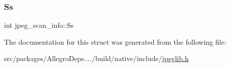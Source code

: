 \subsubsection{\texorpdfstring{Ss}{Ss}}
{\footnotesize\ttfamily int jpeg\+\_\+scan\+\_\+info\+::\+Ss}



The documentation for this struct was generated from the following file\+:\begin{DoxyCompactItemize}
\item 
src/packages/\+Allegro\+Deps..../build/native/include/\hyperlink{jpeglib_8h}{jpeglib.\+h}\end{DoxyCompactItemize}
